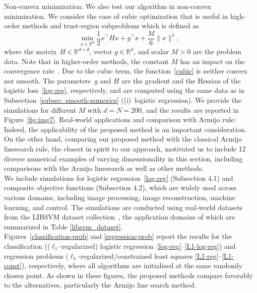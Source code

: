 \documentclass[11pt, a4paper, oneside, reqno]{amsart}
\makeatletter
\def\subsection{\@startsection{subsection}{2}%
	\z@{.5\linespacing\@plus.7\linespacing}{.5\linespacing}%
	{\normalfont\large\bfseries}}
\makeatother
\begin{document}
\subsection{Non-convex minimization:}
We also test our algorithm in non-convex minimization. We consider the case of cubic optimization that is useful in high-order methods and trust-region subproblems \cite{Nesterov2006, chen2022accelerating} which is defined as 
\begin{equation}
\label{cubic}
    \min_{x\in\mathbb{R}^d} \dfrac{1}{2}x^\top H x + g^\top x + \dfrac{M}{6} \|x\|^3, 
\end{equation}
where the matrix~$H\in \mathbb{R}^{d\times d}$, vector $g\in \mathbb{R}^d$, and scalar $M > 0$ are the problem data. Note that in higher-order methods, the constant $M$ has an impact on the convergence rate~\cite{Nesterov2008}. Due to the cubic term, the function~\eqref{cubic} is neither convex nor smooth. The parameters~$g$ and $H$ are the gradient and the Hessian of the logistic loss~\eqref{log-reg}, respectively, and are computed using the same data as in Subsection~\ref{subsec: smooth-numerics} ((i)~logistic regression). We provide the simulations for different $M$ with $d = N = 200$, and the results are reported in Figure~\ref{fig:img7}.
{\subsection{Real-world applications and comparison with Armijo rule:}
Indeed, the applicability of the proposed method is an important consideration. On the other hand, comparing our proposed method with the classical Armijo linesearch rule, the closest in spirit to our approach, motivated us to include 12 diverse numerical examples of varying dimensionality in this section, including comparisons with the Armijo linesearch as well as other methods.\\
We include simulations for logistic regression~\eqref{log-reg} (Subsection 4.1) and composite objective functions (Subsection 4.2), which are widely used across various domains, including image processing, image reconstruction, machine learning, and control. The simulations are conducted using real-world datasets from the LIBSVM dataset collection~\cite{chang2011libsvm}, the application domains of which are summarized in Table \ref{libsvm_dataset}.\\
Figures~\ref{classification-prob} and \ref{regression-prob} report the results for the classification (($\ell_1$-regularized) logistic regression~\eqref{log-reg}--\eqref{L1-log-reg}) and regression problems ($\ell_1$-regularized/constrained least squares \eqref{L1-reg}--\eqref{L1-const}), respectively, where all algorithms are initialized at the same randomly chosen point. As shown in these figures, the proposed methods compare favorably to the alternatives, particularly the Armijo line search method.}
\end{document}
